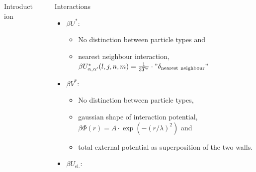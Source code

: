 \documentclass{beamer}
\newlength{\sepwid}
\newlength{\onecolwid}
\newcommand{\kasten}[2][test]{\begin{block}{\rule[-0.6ex]{0pt}{2.5ex}#1}\vspace{0.5cm}#2\end{block}}
\begin{document}
\begin{frame}[t]{}
\begin{columns}[t]
\begin{column}{\onecolwid}
\begin{block}{Introduction}
				\end{block}
			\end{column}
			\begin{column}{\sepwid}\end{column}
			\begin{column}{\onecolwid}
				\kasten[Interactions]{
                                         \begin{itemize}
                                                 \item $\beta U^*$:
                                                         \begin{itemize}
                                                                 \normalsize
                                                                 \item No distinction between particle types and
                                                                 \item nearest neighbour interaction, $\beta U^*_{\alpha,\alpha'}(l,j,n,m) = \frac{1}{3T^*} \cdot "\delta_{\mathrm{nearest\ neighbour}}"$
                                                         \end{itemize}
                                                         \vspace{1cm}
                                                 \item $\beta V^*$:
                                                         \begin{itemize}
                                                                 \normalsize
                                                                 \item No distinction between particle types,
                                                                 \item gaussian shape of interaction potential,\qquad$\beta \Phi(r) = A \cdot \exp\left(-(r/\lambda)^2\right)$ and
                                                                 \item total external potential as superposition     of the two walls.
                                                         \end{itemize}
                                                         \vspace{1cm}
                                                 \item $\beta U_{\mathrm{el.}}$:

\end{itemize}}
\end{column}
\end{columns}
\end{frame}
\end{document}
